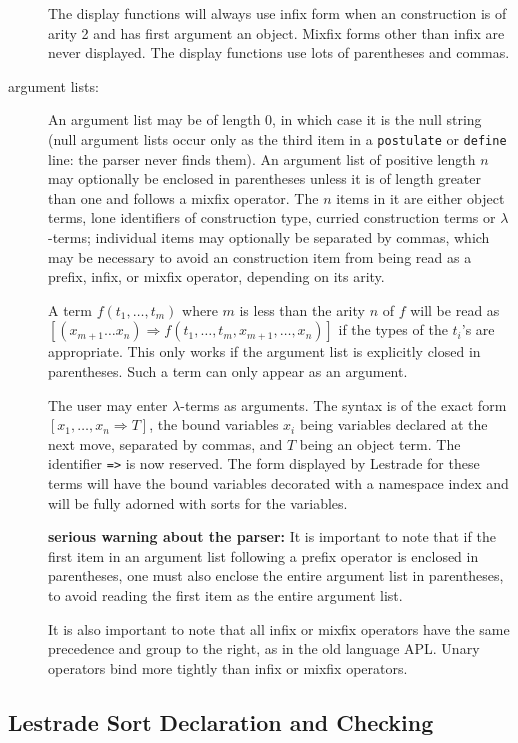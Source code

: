 \documentclass[12pt]{article}
\begin{document}
\begin{description}
The display functions will always use infix form when an construction is of arity 2 and has first argument an object.  Mixfix forms other than infix are never displayed.   The display functions use lots of parentheses and commas.

\item[argument lists:]  An argument list may be of length 0, in which case it is the null string (null argument lists occur only as the third item in a {\tt postulate} or {\tt define} line:  the parser never finds them).  An argument list of positive length $n$ may optionally be enclosed in parentheses unless it is of length greater than one and follows a mixfix operator.  The $n$  items in it are either object terms, lone identifiers of construction type, curried construction terms or $\lambda$-terms;  individual items may optionally be separated by commas, which may be necessary to avoid an construction item from being read as a prefix, infix, or mixfix operator, depending on its arity.  

A term $f(t_1,\ldots,t_m)$ where $m$ is less than the arity $n$ of $f$ will be read as $[(x_{m+1}\ldots x_n) \Rightarrow f(t_1,\ldots,t_m,x_{m+1},\dots,x_n)]$ if the types of the $t_i$'s are appropriate.  This only works if the argument list is explicitly closed in parentheses.    Such a term can only appear as an argument.

The user may enter $\lambda$-terms as arguments.  The syntax is of the exact form $[x_1,\ldots,x_n \Rightarrow T]$, the bound variables $x_i$ being variables declared at the next move, separated by commas, and $T$ being an object term.  The identifier {\tt =>} is now reserved.  The form displayed by Lestrade for these terms will have the bound variables decorated with a namespace index and will be fully adorned with sorts for the variables.

{\bf serious warning about the parser:} It is important to note that if the first item in an argument list following a prefix operator is enclosed in parentheses, one must also enclose the entire argument list in parentheses, to avoid reading the first item as the entire argument list.

It is also important to note that all infix or mixfix operators have the same precedence and group to the right, as in the old language APL.  Unary operators bind more tightly than infix or mixfix operators.

\end{description}

\subsection{Lestrade Sort Declaration and Checking}
\end{document}
